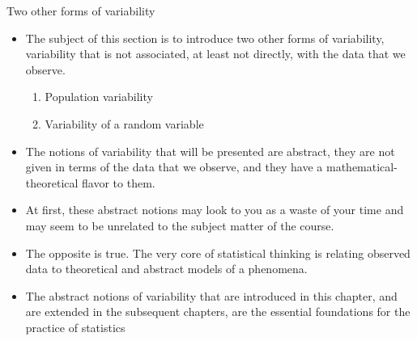\documentclass[10pt,handout]{beamer}\usepackage[]{graphicx}\usepackage[]{color}
\begin{document}
\begin{frame}{Two other forms of variability}
	
	\begin{itemize}
		
		\item  The subject of this section is to introduce two other forms of
		variability, variability that is not associated, at least not directly,
		with the data that we observe. \pause
		\begin{enumerate}
			\item Population variability
			\item Variability of a random variable
		\end{enumerate}

	\pause
		
		\item The notions of variability that will be presented are abstract, they are
		not given in terms of the data that we observe, and they have a
		mathematical-theoretical flavor to them. 
		
		\pause
		
		\item At first, these abstract
		notions may look to you as a waste of your time and may seem to be
		unrelated to the subject matter of the course. 
		
		\pause
		
		\item The opposite is true. The
		very core of statistical thinking is relating observed data to
		theoretical and abstract models of a phenomena. 
		
		\pause 
		\item The abstract notions of variability that are introduced in this
		chapter, and are extended in the subsequent chapters, are the essential foundations for the practice of
		statistics
	\end{itemize}
	
\end{frame}
\end{document}
